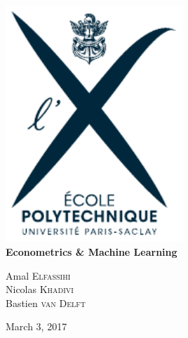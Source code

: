 \newcommand{\HRule}{\rule{\linewidth}{0.5mm}}

\begin{titlepage}
\begin{center}
\includegraphics[width=0.5\textwidth]{img/logo_polytechnique.pdf}\\[0.45cm]

\vspace{0.4cm}
{\LARGE \bfseries Econometrics \& Machine Learning}\\[0.4cm]
\vspace{1.5cm}

{Amal \textsc{Elfassihi}} \\
{Nicolas \textsc{Khadivi}} \\
{Bastien \textsc{van Delft}} \\
\vfill

{\large March 3, 2017}
\end{center}
\end{titlepage}

\newpage\null\thispagestyle{empty}\newpage  %

\setcounter{page}{3}
\tableofcontents

\newpage\null\thispagestyle{empty}\newpage  %
